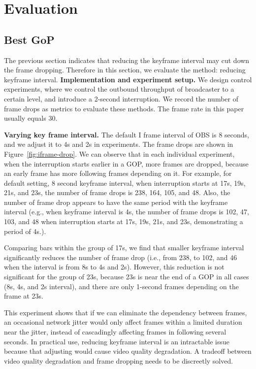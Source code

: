 \section{Evaluation}

\subsection{Best GoP}
The previous section indicates that reducing the keyframe interval may cut down the frame dropping. Therefore in this section, we evaluate the method: reducing keyframe interval.
\textbf{Implementation and experiment setup.}
We design control experiments, where we control the outbound throughput of broadcaster to a certain level, and introduce a 2-second interruption. We record the number of frame drops as metrics to evaluate these methods. The frame rate in this paper usually equals 30.


\textbf{Varying key frame interval.} The default I frame interval of OBS is 8 seconds, and we adjust it to 4s and 2s in experiments. The frame drops are shown in Figure~\ref{fig:iframe-drop}. We can observe that in each individual experiment, when the interruption starts earlier in a GOP, more frames are dropped, because an early frame has more following frames depending on it. For example, for default setting, 8 second keyframe interval, when interruption starts at 17s, 19s, 21s, and 23s, the number of frame drops is 238, 164, 105, and 48.
Also, the number of frame drop appears to have the same period with the keyframe interval (e.g., when keyframe interval is 4s, the number of frame drops is 102, 47, 103, and 48 when interruption starts at 17s, 19s, 21s, and 23s, demonstrating a period of 4s.).

Comparing bars within the group of 17s, we find that smaller keyframe interval significantly reduces the number of frame drop (i.e., from 238, to 102, and 46 when the interval is from 8s to 4s and 2s). However, this reduction is not significant for the group of 23s, because 23s is near the end of a GOP in all cases (8s, 4s, and 2s interval), and there are only 1-second frames depending on the frame at 23s.

This experiment shows that if we can eliminate the dependency between frames, an occasional network jitter would only affect frames within a limited duration near the jitter, instead of cascadingly affecting frames in following several seconds. In practical use, reducing keyframe interval is an intractable issue because that adjusting would cause video quality degradation. A tradeoff between video quality degradation and frame dropping needs to be discreetly solved.

